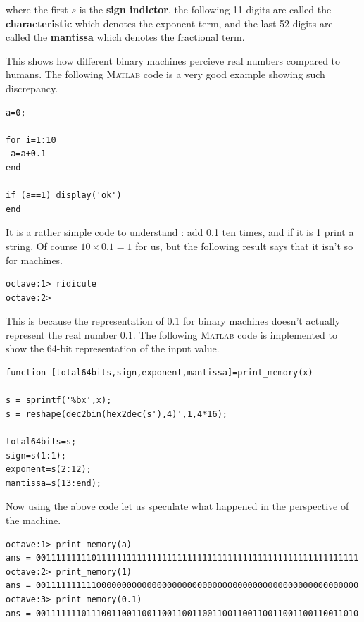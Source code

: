 \documentclass[paper=a4, fontsize=11pt]{scrartcl}
\newcommand{\MATLAB}{\textsc{Matlab}\xspace}
\begin{document}
where the first $s$ is the \textbf{sign indictor}, the following 11 digits are called the \textbf{characteristic} which denotes the exponent term, and the last 52 digits are called the \textbf{mantissa} which denotes the fractional term. 

This shows how different binary machines percieve real numbers compared to humans. The following \MATLAB code is a very good example showing such discrepancy.\\

\begin{lstlisting}[label=ridicule.m,caption=ridicule.m]
a=0;

for i=1:10
 a=a+0.1  
end

if (a==1) display('ok')
end
\end{lstlisting} 
\vspace{0.15in}

It is a rather simple code to understand : add 0.1 ten times, and if it is 1 print a string. Of course $10 \times 0.1 = 1$ for us, but the following result says that it isn't so for machines.

\begin{verbatim}
octave:1> ridicule
octave:2> 
\end{verbatim} 

This is because the representation of $0.1$ for binary machines doesn't actually represent the real number $0.1$. The following \MATLAB code is implemented to show the 64-bit representation of the input value.\\

\begin{lstlisting}[label=printmem, caption=print\_memory.m]
function [total64bits,sign,exponent,mantissa]=print_memory(x)

s = sprintf('%bx',x);
s = reshape(dec2bin(hex2dec(s'),4)',1,4*16);

total64bits=s;
sign=s(1:1);
exponent=s(2:12);
mantissa=s(13:end);
\end{lstlisting}
\vspace{0.15in}

Now using the above code let us speculate what happened in the perspective of the machine.

\begin{verbatim}
octave:1> print_memory(a)
ans = 0011111111101111111111111111111111111111111111111111111111111111
octave:2> print_memory(1)
ans = 0011111111110000000000000000000000000000000000000000000000000000
octave:3> print_memory(0.1)
ans = 0011111110111001100110011001100110011001100110011001100110011010
\end{verbatim}
\end{document}
